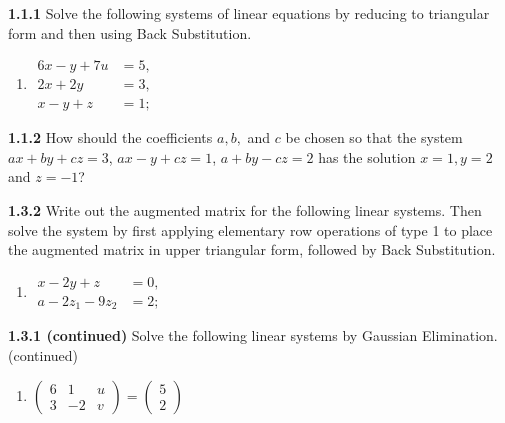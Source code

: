 \documentclass{article}
\begin{document}
\textbf{1.1.1} Solve the following systems of linear equations by reducing to triangular form and then using Back Substitution.
\begin{enumerate}
    \item \(\begin{aligned}
    6x - y + 7u &= 5, \\
    2x + 2y &= 3, \\
    x - y + z &= 1;
    \end{aligned}\)
\end{enumerate}
\vspace{10pt}

\textbf{1.1.2} How should the coefficients \(a, b,\) and \(c\) be chosen so that the system \(ax + by + cz = 3\), \(ax - y + cz = 1\), \(a + by - cz = 2\) has the solution \(x = 1, y = 2\) and \(z = -1\)?
\vspace{10pt}

\textbf{1.3.2} Write out the augmented matrix for the following linear systems. Then solve the system by first applying elementary row operations of type 1 to place the augmented matrix in upper triangular form, followed by Back Substitution.
\begin{enumerate}
    \item \(\begin{aligned}
    x - 2y + z &= 0, \\
    a - 2z_1 - 9z_2 &= 2;
    \end{aligned}\)
\end{enumerate}
\vspace{10pt}

\textbf{1.3.1 (continued)} Solve the following linear systems by Gaussian Elimination. (continued)
\begin{enumerate}
    \item \(\begin{pmatrix}
    6 & 1 & u \\
    3 & -2 & v
    \end{pmatrix} = \begin{pmatrix}
    5 \\
    2
    \end{pmatrix}\)
\end{enumerate}
\vspace{10pt}
\end{document}
